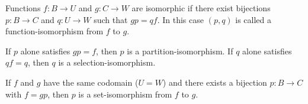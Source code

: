 Functions $f: B \rightarrow U$ and $g: C \rightarrow W$ are isomorphic if there exist bijections $p: B \rightarrow C$ and $q: U \rightarrow W$ such that $g p = q f$. In this case $(p, q)$ is called a function-isomorphism from $f$ to $g$.

If $p$ alone satisfies $g p = f$, then $p$ is a partition-isomorphism. If $q$ alone satisfies $q f = q$, then $q$ is a selection-isomorphism.

If $f$ and $g$ have the same codomain ($U = W$) and there exists a bijection $p: B \rightarrow C$ with $f = g p$, then $p$ is a set-isomorphism from $f$ to $g$.
